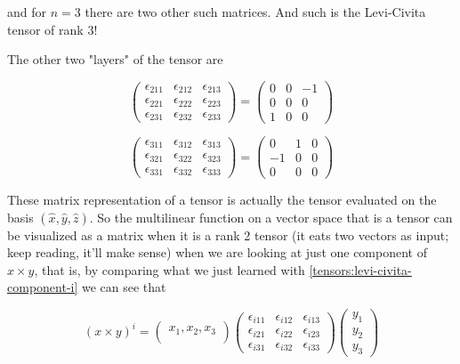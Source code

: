 and for $n=3$ there are two other such matrices.
And such is the Levi-Civita tensor of rank 3!

The other two "layers" of the tensor are

$$
\begin{pmatrix}
\epsilon_{211} & \epsilon_{212} & \epsilon_{213} \\
\epsilon_{221} & \epsilon_{222} & \epsilon_{223} \\
\epsilon_{231} & \epsilon_{232} & \epsilon_{233}
\end{pmatrix}
=
\begin{pmatrix}
0 & 0 & -1 \\
0 & 0 & 0 \\
1 & 0 & 0
\end{pmatrix}
$$

$$
\begin{pmatrix}
\epsilon_{311} & \epsilon_{312} & \epsilon_{313} \\
\epsilon_{321} & \epsilon_{322} & \epsilon_{323} \\
\epsilon_{331} & \epsilon_{332} & \epsilon_{333}
\end{pmatrix}
=
\begin{pmatrix}
0 & 1 & 0 \\
-1 & 0 & 0 \\
0 & 0 & 0
\end{pmatrix}
$$

These matrix representation of a tensor is actually the tensor evaluated on the basis $(\hat{x}, \hat{y}, \hat{z})$.
So the multilinear function on a vector space that is a tensor can be visualized as a matrix when it is a rank 2 tensor
(it eats two vectors as input; keep reading, it'll make sense) when we are looking at just one component of
$x \times y$, that is, by comparing what we just learned with \ref{tensors:levi-civita-component-i} we can see that

$$
\left( x \times y \right)^i =
\begin{pmatrix}
    x_1, x_2, x_3 \\
\end{pmatrix}
\begin{pmatrix}
    \epsilon_{i11} & \epsilon_{i12} & \epsilon_{i13} \\
    \epsilon_{i21} & \epsilon_{i22} & \epsilon_{i23} \\
    \epsilon_{i31} & \epsilon_{i32} & \epsilon_{i33}
\end{pmatrix}
\begin{pmatrix}
    y_1 \\
    y_2 \\
    y_3
\end{pmatrix}
$$


